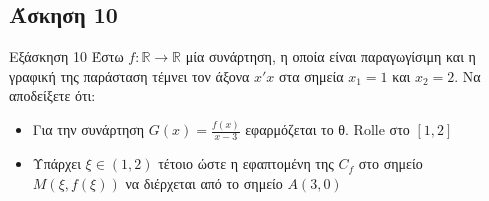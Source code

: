 \documentclass[greek]{beamer}
\begin{document}
\subsection{Άσκηση 10}
\begin{frame}[label=Άσκηση10]{Εξάσκηση 10}
  Έστω $f:\mathbb{R}\to\mathbb{R}$ μία συνάρτηση, η οποία είναι παραγωγίσιμη και η γραφική της παράσταση τέμνει τον άξονα $x'x$ στα σημεία $x_1=1$ και $x_2=2$. Να αποδείξετε ότι:
  \begin{itemize}
    \item Για την συνάρτηση $G(x)=\frac{f(x)}{x-3}$ εφαρμόζεται το θ. Rolle στο $[1,2]$
    \item Υπάρχει $ξ\in (1,2)$ τέτοιο ώστε η εφαπτομένη της $C_f$ στο σημείο $Μ(ξ,f(ξ))$ να διέρχεται από το σημείο $Α(3,0)$
  \end{itemize}
\end{frame}
\end{document}
